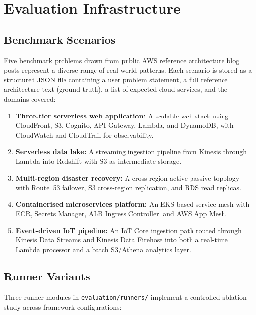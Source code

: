 \section{Evaluation Infrastructure}

\subsection{Benchmark Scenarios}

Five benchmark problems drawn from public AWS reference architecture blog posts represent a diverse range of real-world patterns. Each scenario is stored as a structured JSON file containing a user problem statement, a full reference architecture text (ground truth), a list of expected cloud services, and the domains covered:

\begin{enumerate}
    \item \textbf{Three-tier serverless web application:} A scalable web stack using CloudFront, S3, Cognito, API Gateway, Lambda, and DynamoDB, with CloudWatch and CloudTrail for observability.
    \item \textbf{Serverless data lake:} A streaming ingestion pipeline from Kinesis through Lambda into Redshift with S3 as intermediate storage.
    \item \textbf{Multi-region disaster recovery:} A cross-region active-passive topology with Route~53 failover, S3 cross-region replication, and RDS read replicas.
    \item \textbf{Containerised microservices platform:} An EKS-based service mesh with ECR, Secrets Manager, ALB Ingress Controller, and AWS App Mesh.
    \item \textbf{Event-driven IoT pipeline:} An IoT Core ingestion path routed through Kinesis Data Streams and Kinesis Data Firehose into both a real-time Lambda processor and a batch S3/Athena analytics layer.
\end{enumerate}

\subsection{Runner Variants}

Three runner modules in \texttt{evaluation/runners/} implement a controlled ablation study across framework configurations:

